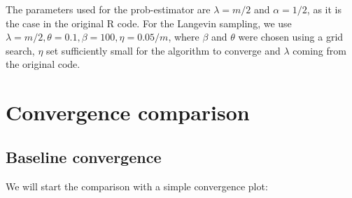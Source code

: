 \documentclass[12pt]{memoir}
\begin{document}
The parameters used for the prob-estimator are $\lambda=m/2$ and $\alpha=1/2$, as it is the case in the original R code. For the Langevin sampling, we use $\lambda=m/2,\theta=0.1,\beta=100,\eta=0.05/m$, where $\beta$ and $\theta$ were chosen using a grid search, $\eta$ set sufficiently small for the algorithm to converge and $\lambda$ coming from the original code.

\section{Convergence comparison}\label{section:convergence-comparison}

\subsection*{Baseline convergence}

We will start the comparison with a simple convergence plot:
\end{document}

